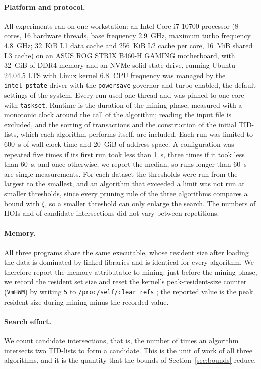 \documentclass[pdflatex,sn-mathphys,Numbered]{sn-jnl}
\theoremstyle{thmstyleone}
\theoremstyle{thmstyletwo}
\theoremstyle{thmstylethree}
\begin{document}
\paragraph{Platform and protocol.}
All experiments ran on one workstation: an Intel Core i7-10700 processor (8 cores, 16 hardware threads, base frequency 2.9~GHz, maximum turbo frequency 4.8~GHz; 32~KiB L1 data cache and 256~KiB L2 cache per core, 16~MiB shared L3 cache) on an ASUS ROG STRIX B460-H GAMING motherboard, with 32~GiB of DDR4 memory and an NVMe solid-state drive, running Ubuntu 24.04.5 LTS with Linux kernel 6.8. CPU frequency was managed by the \texttt{intel\_pstate} driver with the \texttt{powersave} governor and turbo enabled, the default settings of the system. Every run used one thread and was pinned to one core with \texttt{taskset}. Runtime is the duration of the mining phase, measured with a monotonic clock around the call of the algorithm; reading the input file is excluded, and the sorting of transactions and the construction of the initial TID-lists, which each algorithm performs itself, are included. Each run was limited to 600~s of wall-clock time and 20~GiB of address space. A configuration was repeated five times if its first run took less than 1~s, three times if it took less than 60~s, and once otherwise; we report the median, so runs longer than 60~s are single measurements. For each dataset the thresholds were run from the largest to the smallest, and an algorithm that exceeded a limit was not run at smaller thresholds, since every pruning rule of the three algorithms compares a bound with $\xi$, so a smaller threshold can only enlarge the search. The numbers of HOIs and of candidate intersections did not vary between repetitions.

\paragraph{Memory.}
All three programs share the same executable, whose resident size after loading the data is dominated by linked libraries and is identical for every algorithm. We therefore report the memory attributable to mining: just before the mining phase, we record the resident set size and reset the kernel's peak-resident-size counter (\texttt{VmHWM}) by writing \texttt{5} to \texttt{/proc/self/clear\_refs} \cite{linuxproc}; the reported value is the peak resident size during mining minus the recorded value.

\paragraph{Search effort.}
We count candidate intersections, that is, the number of times an algorithm intersects two TID-lists to form a candidate. This is the unit of work of all three algorithms, and it is the quantity that the bounds of Section~\ref{sec:bounds} reduce.
\end{document}
